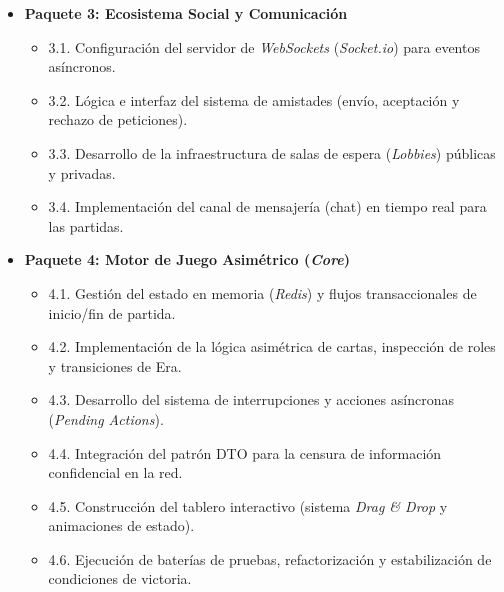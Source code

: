 \begin{itemize}
\begin{itemize}
\item 2.4. Construcción de interfaces reactivas para el Registro, Inicio de Sesión y gestión del Perfil.

\end{itemize}


\item \textbf{Paquete 3: Ecosistema Social y Comunicación}

\begin{itemize}

\item 3.1. Configuración del servidor de \textit{WebSockets} (\textit{Socket.io}) para eventos asíncronos.

\item 3.2. Lógica e interfaz del sistema de amistades (envío, aceptación y rechazo de peticiones).

\item 3.3. Desarrollo de la infraestructura de salas de espera (\textit{Lobbies}) públicas y privadas.

\item 3.4. Implementación del canal de mensajería (chat) en tiempo real para las partidas.

\end{itemize}


\item \textbf{Paquete 4: Motor de Juego Asimétrico (\textit{Core})}

\begin{itemize}

\item 4.1. Gestión del estado en memoria (\textit{Redis}) y flujos transaccionales de inicio/fin de partida.

\item 4.2. Implementación de la lógica asimétrica de cartas, inspección de roles y transiciones de Era.

\item 4.3. Desarrollo del sistema de interrupciones y acciones asíncronas (\textit{Pending Actions}).

\item 4.4. Integración del patrón DTO para la censura de información confidencial en la red.

\item 4.5. Construcción del tablero interactivo (sistema \textit{Drag \& Drop} y animaciones de estado).

\item 4.6. Ejecución de baterías de pruebas, refactorización y estabilización de condiciones de victoria.

\end{itemize}

\end{itemize} 

